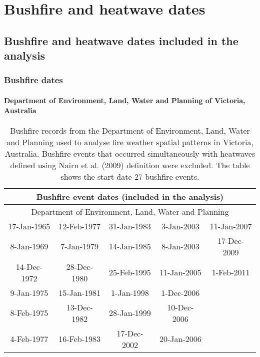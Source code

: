 \appendix

\chapter{Bushfire and heatwave dates}

\newpage{}


\section{Bushfire and heatwave dates included in the analysis}


\subsection{Bushfire dates }


\subsubsection{Department of Environment, Land, Water and Planning of Victoria,
Australia }

\begin{table}[H]
\caption{Bushfire records from the Department of Environment, Land, Water and
Planning used to analyse fire weather spatial patterns in Victoria,
Australia. Bushfire events that occurred simultaneously with heatwaves
defined using Nairn et al. (2009) definition were excluded. The table
shows the start date 27 bushfire events. \label{tab:Bushfire records from the Department of Environment, Land, Water and Planning used to analyse fire weather spatial patterns in Victoria, Australia}}


\centering{}%
\begin{tabular}{|c|c|c|c|c|}
\hline 
\multicolumn{5}{|c|}{\textbf{Bushfire event dates (included in the analysis)}}\tabularnewline
\hline 
\multicolumn{5}{|c|}{Department of Environment, Land, Water and Planning}\tabularnewline
\hline 
\hline 
17-Jan-1965 & 12-Feb-1977 & 31-Jan-1983 & 3-Jan-2003 & 11-Jan-2007\tabularnewline
\hline 
8-Jan-1969 & 7-Jan-1979 & 14-Jan-1985 & 8-Jan-2003 & 17-Dec-2009\tabularnewline
\hline 
14-Dec-1972 & 28-Dec-1980 & 25-Feb-1995 & 11-Jan-2005 & 1-Feb-2011\tabularnewline
\hline 
9-Jan-1975 & 15-Jan-1981 & 1-Jan-1998 & 1-Dec-2006 & \tabularnewline
\hline 
8-Feb-1975 & 13-Dec-1982 & 28-Jan-1999 & 10-Dec-2006 & \tabularnewline
\hline 
4-Feb-1977 & 16-Feb-1983 & 17-Dec-2002 & 20-Jan-2006 & \tabularnewline
\hline 
\end{tabular}
\end{table}



